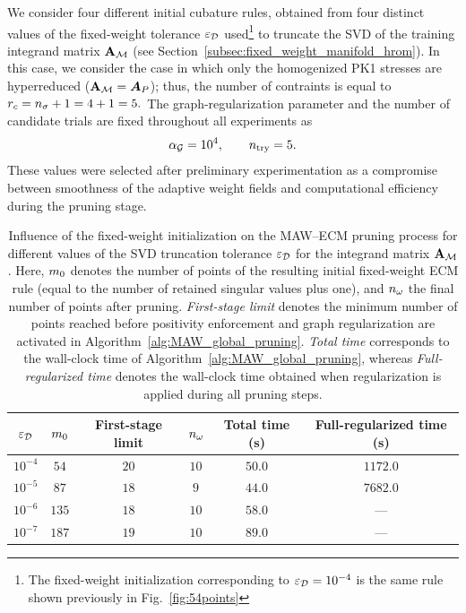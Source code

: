 \documentclass[11pt,a4paper]{article}
\begin{document}
We consider four different initial cubature rules, obtained from four distinct values of the fixed-weight tolerance
$\varepsilon_{\mathcal{D}}$ used\footnote{The fixed-weight initialization corresponding to
$\varepsilon_{\mathcal{D}}=10^{-4}$
is the same rule shown previously in Fig.~\ref{fig:54points}} to truncate the SVD of the training integrand matrix $\mathbf{A}_{\mathcal{M}}$ (see Section~\ref{subsec:fixed_weight_manifold_hrom}). In this case, we  consider the case in which  only the homogenized PK1 stresses are hyperreduced ($\mathbf{A}_{\mathcal{M}} = \bm{A}_{P}$); thus, the number of contraints is equal to
\(
r_c = n_{\sigma} + 1 = 4 + 1 = 5.
\)  The graph-regularization parameter and the number of candidate trials are fixed throughout all experiments as
\[
\alpha_{\mathcal{G}} = 10^4,
\qquad
n_{\mathrm{try}} = 5.
\]
These values were selected after preliminary experimentation as a compromise between smoothness of the adaptive weight fields and computational efficiency during the pruning stage.


\begin{table}[ht!]
\centering
\caption{Influence of the fixed-weight initialization on the MAW--ECM pruning process for different values of the   SVD truncation tolerance $\varepsilon_{\mathcal{D}}$ for the integrand matrix $\mathbf{A}_{\mathcal{M}}$.  Here, $m_0$ denotes the number of points of the resulting initial fixed-weight ECM rule (equal to the number of retained singular values plus one), and $n_{\omega}$ the final number of points after pruning. \emph{First-stage limit} denotes the minimum number of points reached before positivity enforcement and graph regularization are activated in Algorithm~\ref{alg:MAW_global_pruning}. \emph{Total time} corresponds to the wall-clock time of Algorithm~\ref{alg:MAW_global_pruning}, whereas \emph{Full-regularized time} denotes the wall-clock time obtained when regularization is applied during all pruning steps.    }
\label{tab:maw_pruning_summary}
\begin{tabular}{cccccc}
\hline
$\varepsilon_{\mathcal{D}}$ & $m_0$ & First-stage limit &   $n_{\omega}$ & Total time  (s) & Full-regularized time (s) \\
\hline
$10^{-4}$ & $54$  & $20$ & $10$ & $50.0$ & $  1172.0$ \\
$10^{-5}$ & $87$  & $18$ & $9$  & $44.0$ & $  7682.0$  \\
$10^{-6}$ & $135$ & $18$ & $10$ & $58.0$ & --- \\
$10^{-7}$ & $187$ & $19$ & $10$ & $89.0$ & --- \\
\hline
\end{tabular}
\end{table}
\end{document}
